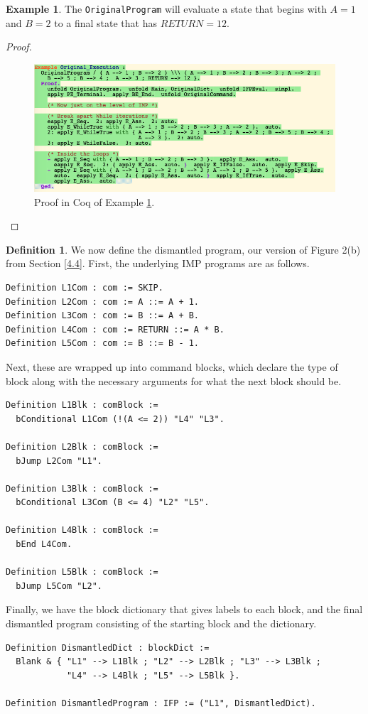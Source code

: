 \documentclass[12pt,notitlepage]{report}
\theoremstyle{plain}
\theoremstyle{definition}
\newtheorem{defin}[theo]{Definition}
\newtheorem{example}[theo]{Example}
\numberwithin{equation}{section}
\begin{document}
\begin{example}\label{while1}
The \verb$OriginalProgram$ will evaluate a state that begins with $A=1$ and $B=2$ to a final state that has $RETURN=12$.
\begin{proof}
    \noindent
    \begin{figure}[H]
        \centering
        \includegraphics[scale=0.6]{while1.png}
        \caption{Proof in Coq of Example \ref{while1}.}
        \label{fig:while1}
        \end{figure}
\end{proof}
\end{example}

\begin{defin}
We now define the dismantled program, our version of Figure 2(b) from Section \ref{4.4}.  First, the underlying IMP programs are as follows.

\begin{verbatim}
Definition L1Com : com := SKIP.
Definition L2Com : com := A ::= A + 1.
Definition L3Com : com := B ::= A + B.
Definition L4Com : com := RETURN ::= A * B.
Definition L5Com : com := B ::= B - 1.\end{verbatim}
Next, these are wrapped up into command blocks, which declare the type of block along with the necessary arguments for what the next block should be.
\begin{verbatim}
Definition L1Blk : comBlock :=
  bConditional L1Com (!(A <= 2)) "L4" "L3".

Definition L2Blk : comBlock :=
  bJump L2Com "L1".

Definition L3Blk : comBlock :=
  bConditional L3Com (B <= 4) "L2" "L5".

Definition L4Blk : comBlock :=
  bEnd L4Com.

Definition L5Blk : comBlock :=
  bJump L5Com "L2".\end{verbatim}
 
Finally, we have the block dictionary that gives labels to each block, and the final dismantled program consisting of the starting block and the dictionary.
\begin{verbatim}
Definition DismantledDict : blockDict :=
  Blank & { "L1" --> L1Blk ; "L2" --> L2Blk ; "L3" --> L3Blk ; 
            "L4" --> L4Blk ; "L5" --> L5Blk }.

Definition DismantledProgram : IFP := ("L1", DismantledDict).
\end{verbatim}
\end{defin}
\end{document}
